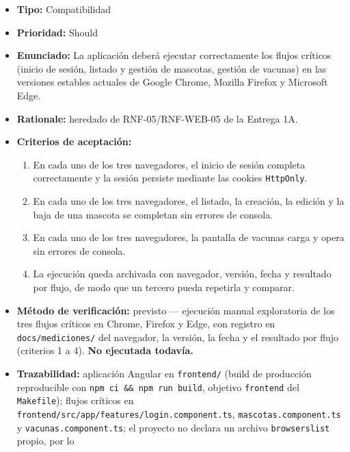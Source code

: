 \documentclass[
  spanish,
]{article}
\providecommand{\tightlist}{%
  \setlength{\itemsep}{0pt}\setlength{\parskip}{0pt}}
\begin{document}
\begin{itemize}
\tightlist
\item
  \textbf{Tipo:} Compatibilidad
\item
  \textbf{Prioridad:} Should
\item
  \textbf{Enunciado:} La aplicación deberá ejecutar correctamente los
  flujos críticos (inicio de sesión, listado y gestión de mascotas,
  gestión de vacunas) en las versiones estables actuales de Google
  Chrome, Mozilla Firefox y Microsoft Edge.
\item
  \textbf{Rationale:} heredado de RNF-05/RNF-WEB-05 de la Entrega 1A.
\item
  \textbf{Criterios de aceptación:}

  \begin{enumerate}
  \def\labelenumi{\arabic{enumi}.}
  \tightlist
  \item
    En cada uno de los tres navegadores, el inicio de sesión completa
    correctamente y la sesión persiste mediante las cookies
    \texttt{Http\allowbreak{}Only}.
  \item
    En cada uno de los tres navegadores, el listado, la creación, la
    edición y la baja de una mascota se completan sin errores de
    consola.
  \item
    En cada uno de los tres navegadores, la pantalla de vacunas carga y
    opera sin errores de consola.
  \item
    La ejecución queda archivada con navegador, versión, fecha y
    resultado por flujo, de modo que un tercero pueda repetirla y
    comparar.
  \end{enumerate}
\item
  \textbf{Método de verificación:} previsto --- ejecución manual
  exploratoria de los tres flujos críticos en Chrome, Firefox y Edge,
  con registro en \texttt{docs/\allowbreak{}mediciones/} del navegador, la versión,
  la fecha y el resultado por flujo (criterios 1 a 4). \textbf{No
  ejecutada todavía.}
\item
  \textbf{Trazabilidad:} aplicación Angular en \texttt{frontend/} (build
  de producción reproducible con
  \texttt{npm\ ci\ \&\&\ npm\ run\ build}, objetivo \texttt{frontend}
  del \texttt{Makefile}); flujos críticos en
  \texttt{frontend/\allowbreak{}src/\allowbreak{}app/\allowbreak{}features/\allowbreak{}login.\allowbreak{}component.\allowbreak{}ts},
  \texttt{mascotas.\allowbreak{}component.\allowbreak{}ts} y \texttt{vacunas.\allowbreak{}component.\allowbreak{}ts}; el
  proyecto no declara un archivo \texttt{browserslist} propio, por lo

\end{itemize}
\end{document}
